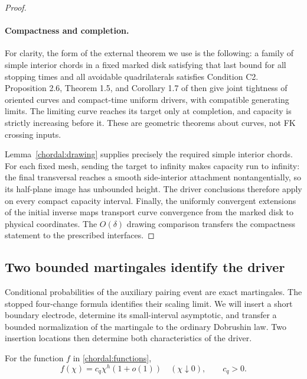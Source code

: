 \begin{proof}
\paragraph{Compactness and completion.}
For clarity, the form of the external theorem we use is the
following: a family of simple interior chords in a fixed marked
disk satisfying that last bound for all stopping times and all
avoidable quadrilaterals satisfies Condition C2.  Proposition 2.6,
Theorem 1.5, and Corollary 1.7 of
\cite{KemppainenSmirnov2017} then give joint tightness of oriented
curves and compact-time uniform drivers, with compatible generating
limits.  The limiting curve reaches its target only at completion,
and capacity is strictly increasing before it.  These are geometric
theorems about curves, not FK crossing inputs.

Lemma~\ref{chordal:drawing} supplies precisely the required simple
interior chords.  For each fixed mesh, sending the target to infinity
makes capacity run to infinity: the final transversal reaches a
smooth side-interior attachment nontangentially, so its half-plane
image has unbounded height.  The driver conclusions therefore apply
on every compact capacity interval.  Finally, the uniformly
convergent extensions of the initial inverse maps transport curve
convergence from the marked disk to physical coordinates.
The $O(\delta)$ drawing comparison transfers the compactness
statement to the prescribed interfaces.
\end{proof}

\subsection{Two bounded martingales identify the driver}

Conditional probabilities of the auxiliary pairing event are exact
martingales.  The stopped four-change formula identifies their
scaling limit.  We will insert a short boundary electrode, determine
its small-interval asymptotic, and transfer a bounded normalization
of the martingale to the ordinary Dobrushin law.  Two insertion
locations then determine both characteristics of the driver.

\begin{lemma}\label{chordal:small-interval}
For the function $f$ in \eqref{chordal:functions},
\[
 f(\chi)=c_q\chi^h(1+o(1))\quad(\chi\downarrow0),
 \qquad c_q>0.
\]
\end{lemma}

